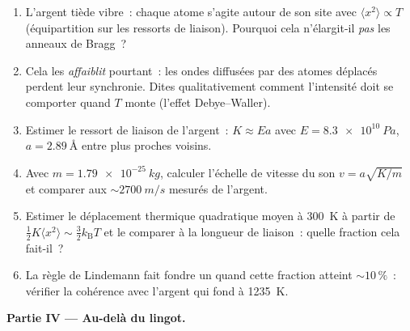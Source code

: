\begin{problem}
\begin{enumerate}[resume]
  \item L'argent tiède vibre~: chaque atome s'agite autour de son
        site avec $\langle x^2\rangle \propto T$ (équipartition sur
        les ressorts de liaison). Pourquoi cela n'élargit-il
        \emph{pas} les anneaux de Bragg~?
  \item Cela les \emph{affaiblit} pourtant~: les ondes diffusées par
        des atomes déplacés perdent leur synchronie. Dites
        qualitativement comment l'intensité doit se comporter quand
        $T$ monte (l'effet Debye--Waller).
  \item Estimer le ressort de liaison de l'argent~: $K \approx Ea$
        avec $E = \qty{8.3e10}{Pa}$, $a = \qty{2.89}{\angstrom}$
        entre plus proches voisins.
  \item Avec $m = \qty{1.79e-25}{kg}$, calculer l'échelle de vitesse
        du son $v = a\sqrt{K/m}$ et comparer aux
        $\sim\qty{2700}{m/s}$ mesurés de l'argent.
  \item Estimer le déplacement thermique quadratique moyen à
        \qty{300}{K} à partir de $\tfrac12K\langle x^2\rangle \sim
        \tfrac32k_{\text{B}}T$ et le comparer à la longueur de
        liaison~: quelle fraction cela fait-il~?
  \item La règle de Lindemann fait fondre un  quand cette
        fraction atteint $\sim10\,\%$~: vérifier la cohérence avec
        l'argent qui fond à \qty{1235}{K}.
\end{enumerate}

\medskip\noindent\textbf{Partie IV --- Au-delà du lingot.}


\end{problem}
